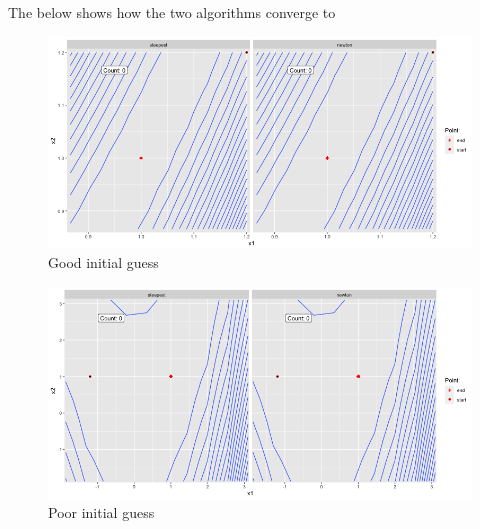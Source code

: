 \documentclass[
]{book}
\begin{document}
The below shows how the two algorithms converge to

\begin{figure}
\centering
\includegraphics{www/p1.gif}
\caption{Good initial guess}
\end{figure}

\begin{figure}
\centering
\includegraphics{www/p2.gif}
\caption{Poor initial guess}
\end{figure}
\end{document}
